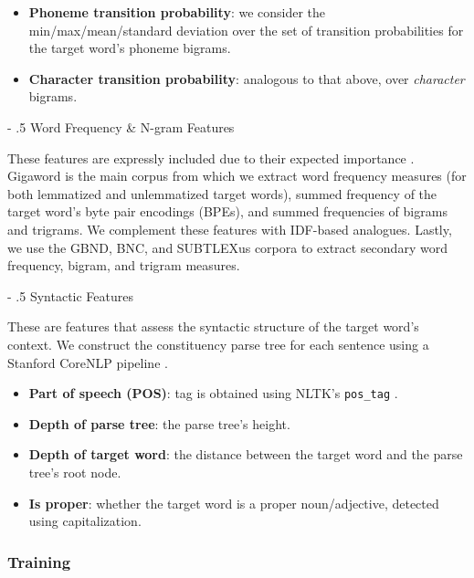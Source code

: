 \documentclass[11pt,a4paper]{article}
\makeatletter
\renewcommand\paragraph{%
    \@startsection{paragraph}{4}{0mm}%
        {-\baselineskip}%
        {.5\baselineskip}%
        {\normalfont\normalsize\bfseries}}
\makeatother
\begin{document}
\begin{itemize}
  \item \textbf{Phoneme transition probability}: we consider the min/max/mean/standard deviation over the set of transition probabilities for the target word's phoneme bigrams.
  \item \textbf{Character transition probability}: analogous to that above, over \textit{character} bigrams.
\end{itemize}

\paragraph{Word Frequency \& N-gram Features}

These features are expressly included due to their expected importance \citep{zampieriEtAl:2017:NLPTEA}. Gigaword is the main corpus from which we extract word frequency measures (for both lemmatized and unlemmatized target words), summed frequency of the target word's byte pair encodings (BPEs), and summed frequencies of bigrams and trigrams. We complement these features with IDF-based analogues. Lastly, we use the GBND, BNC, and SUBTLEXus corpora to extract secondary word frequency, bigram, and trigram measures. 

\paragraph{Syntactic Features}

These are features that assess the syntactic structure of the target word's context. We construct the constituency parse tree for each sentence using a Stanford CoreNLP pipeline \citep{manning-EtAl:2014:P14-5}.

\begin{itemize}
  \item \textbf{Part of speech (POS)}: tag is obtained using NLTK's \texttt{pos\_tag} \citep{Loper02nltk:the}.
  \item \textbf{Depth of parse tree}: the parse tree's height.
  \item \textbf{Depth of target word}: the distance between the target word and the parse tree's root node.
  \item \textbf{Is proper}: whether the target word is a proper noun/adjective, detected using capitalization.
\end{itemize}

\subsubsection{Training}
\end{document}
